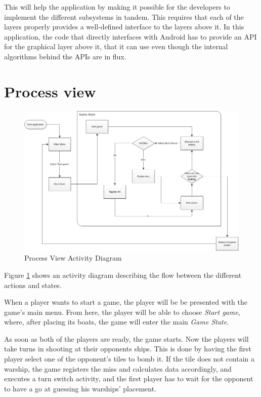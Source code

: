 
This will help the application by making it possible for the developers to implement the different subsystems in tandem. This requires that each of the layers properly provides a well-defined interface to the layers above it. In this application, the code that directly interfaces with Android has to provide an API for the graphical layer above it, that it can use even though the internal algorithms behind the APIs are in flux.


\section{Process view}
    
\begin{figure}[ht]
    \includegraphics[angle=90, scale=0.8]{ProcessLayer.png}
    \caption{Process View Activity Diagram}
    \label{fig:ActivityDiagram}
\end{figure}

Figure \ref{fig:ActivityDiagram} shows an activity diagram describing the flow between the different actions and states.

When a player wants to start a game, the player will be be presented with the game's main menu. From here, the player will be able to choose \emph{Start game}, where, after placing its boats, the game will enter the main \emph{Game State}.

As soon as both of the players are ready, the game starts. Now the players will take turns in shooting at their opponents ships. This is done by having the first player select one of the opponent's tiles to bomb it. If the tile does not contain a warship, the game registers the miss and calculates data accordingly, and executes a turn switch activity, and the first player has to wait for the opponent to have a go at guessing his warships' placement.

